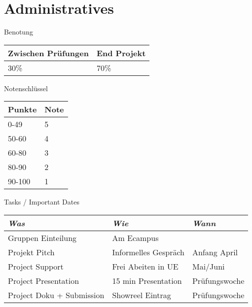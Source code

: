 
\section{Administratives}
 \frame{\sectionpage}

\begin{frame}{Benotung}

 
\begin{table}[]
\begin{tabular}{l|l}
Zwischen Prüfungen & End Projekt \\ \hline
30\%                & 70\%       
\end{tabular}
\end{table}


\end{frame}


\begin{frame}{Notenschlüssel}

 
\begin{table}[]
\begin{tabular}{l|l}
Punkte & Note \\ \hline
0-49   & 5    \\
50-60  & 4    \\
60-80  & 3    \\
80-90  & 2    \\
90-100 & 1   
\end{tabular}
\end{table}

\end{frame}


\begin{frame}{Tasks / Important Dates}
\begin{table}[]
\begin{tabular}{l|l|l}
\emph{Was}   &  \emph{Wie}             &	\emph{Wann}	\\ \hline
Gruppen Einteilung   & Am Ecampus              &		\\  
Projekt Pitch        & Informelles Gespräch              &	Anfang April	\\
Project Support      & Frei Abeiten in UE              &	Mai/Juni	\\
Project Presentation & 15 min Presentation & Prüfungswoche \\
Project Doku + Submission & Showreel Eintrag & Prüfungswoche
\end{tabular}
\end{table}

\end{frame}
